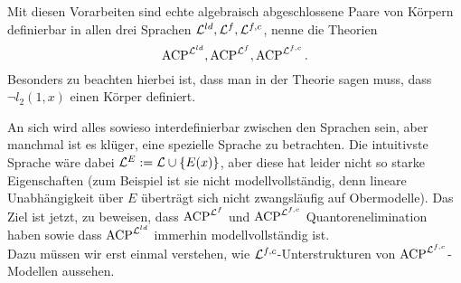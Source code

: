     \begin{lemma}
    	Mit diesen Vorarbeiten sind echte algebraisch abgeschlossene Paare von Körpern definierbar in allen drei Sprachen $\mathcal{L}^{ld},\mathcal{L}^f,\mathcal{L}^{f,c}$, nenne die Theorien $$\operatorname{ACP}^{\mathcal{L}^{ld}},\operatorname{ACP}^{\mathcal{L}^f},\operatorname{ACP}^{\mathcal{L}^{f,c}}.$$ Besonders zu beachten hierbei ist, dass man in der Theorie sagen muss, dass $\neg l_2(1,x)$ einen Körper definiert.
    \end{lemma}
    \newpage
    An sich wird alles sowieso interdefinierbar zwischen den Sprachen sein, aber manchmal ist es klüger, eine spezielle Sprache zu betrachten. Die intuitivste Sprache wäre dabei $\mathcal{L}^E:=\mathcal{L}\cup\{E(x)\}$, aber diese hat leider nicht so starke Eigenschaften (zum Beispiel ist sie nicht modellvollständig, denn lineare Unabhängigkeit über $E$ überträgt sich nicht zwangsläufig auf Obermodelle). Das Ziel ist jetzt, zu beweisen, dass $\operatorname{ACP}^{\mathcal{L}^f}$ und $\operatorname{ACP}^{\mathcal{L}^{f,c}}$ Quantoren\-eli\-mi\-na\-tion haben sowie dass $\operatorname{ACP}^{\mathcal{L}^{ld}}$ immerhin modellvollständig ist.\\
    Dazu müssen wir erst einmal verstehen, wie $\mathcal{L}^{f,c}$-Unterstrukturen von $\operatorname{ACP}^{\mathcal{L}^{f,c}}$-Modellen aussehen.
    
